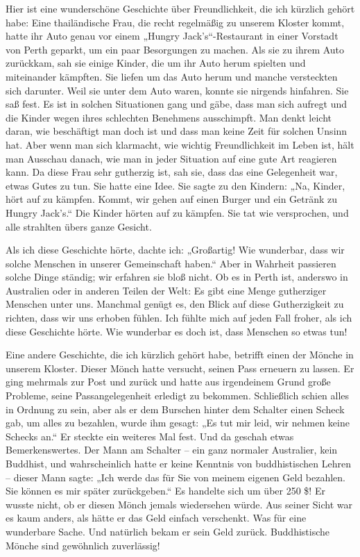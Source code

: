 \documentclass[12pt,openany]{book}
\begin{document}
Hier ist eine wunderschöne Geschichte über Freundlichkeit, die ich kürzlich gehört habe: Eine thailändische Frau, die recht regelmäßig zu unserem Kloster kommt, hatte ihr Auto genau vor einem „Hungry Jack's“-Restaurant in einer Vorstadt von Perth geparkt, um ein paar Besorgungen zu machen. Als sie zu ihrem Auto zurückkam, sah sie einige Kinder, die um ihr Auto herum spielten und miteinander kämpften. Sie liefen um das Auto herum und manche versteckten sich darunter. Weil sie unter dem Auto waren, konnte sie nirgends hinfahren. Sie saß fest. Es ist in solchen Situationen gang und gäbe, dass man sich aufregt und die Kinder wegen ihres schlechten Benehmens ausschimpft. Man denkt leicht daran, wie beschäftigt man doch ist und dass man keine Zeit für solchen Unsinn hat. Aber wenn man sich klarmacht, wie wichtig Freundlichkeit im Leben ist, hält man Ausschau danach, wie man in jeder Situation auf eine gute Art reagieren kann. Da diese Frau sehr gutherzig ist, sah sie, dass das eine Gelegenheit war, etwas Gutes zu tun. Sie hatte eine Idee. Sie sagte zu den Kindern: „Na, Kinder, hört auf zu kämpfen. Kommt, wir gehen auf einen Burger und ein Getränk zu Hungry Jack's.“ Die Kinder hörten auf zu kämpfen. Sie tat wie versprochen, und alle strahlten übers ganze Gesicht.

Als ich diese Geschichte hörte, dachte ich: „Großartig! Wie wunderbar, dass wir solche Menschen in unserer Gemeinschaft haben.“ Aber in Wahrheit passieren solche Dinge ständig; wir erfahren sie bloß nicht. Ob es in Perth ist, anderswo in Australien oder in anderen Teilen der Welt: Es gibt eine Menge gutherziger Menschen unter uns. Manchmal genügt es, den Blick auf diese Gutherzigkeit zu richten, dass wir uns erhoben fühlen. Ich fühlte mich auf jeden Fall froher, als ich diese Geschichte hörte. Wie wunderbar es doch ist, dass Menschen so etwas tun!

Eine andere Geschichte, die ich kürzlich gehört habe, betrifft einen der Mönche in unserem Kloster. Dieser Mönch hatte versucht, seinen Pass erneuern zu lassen. Er ging mehrmals zur Post und zurück und hatte aus irgendeinem Grund große Probleme, seine Passangelegenheit erledigt zu bekommen. Schließlich schien alles in Ordnung zu sein, aber als er dem Burschen hinter dem Schalter einen Scheck gab, um alles zu bezahlen, wurde ihm gesagt: „Es tut mir leid, wir nehmen keine Schecks an.“ Er steckte ein weiteres Mal fest. Und da geschah etwas Bemerkenswertes. Der Mann am Schalter – ein ganz normaler Australier, kein Buddhist, und wahrscheinlich hatte er keine Kenntnis von buddhistischen Lehren – dieser Mann sagte: „Ich werde das für Sie von meinem eigenen Geld bezahlen. Sie können es mir später zurückgeben.“ Es handelte sich um über 250 \$! Er wusste nicht, ob er diesen Mönch jemals wiedersehen würde. Aus seiner Sicht war es kaum anders, als hätte er das Geld einfach verschenkt. Was für eine wunderbare Sache. Und natürlich bekam er sein Geld zurück. Buddhistische Mönche sind gewöhnlich zuverlässig!
\end{document}
